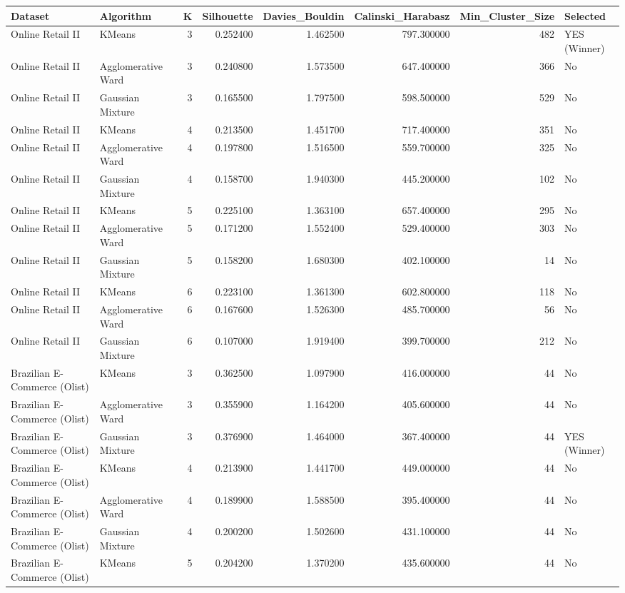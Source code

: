 \begin{tabular}{llrrrrrl}
\toprule
Dataset & Algorithm & K & Silhouette & Davies\_Bouldin & Calinski\_Harabasz & Min\_Cluster\_Size & Selected \\
\midrule
Online Retail II & KMeans & 3 & 0.252400 & 1.462500 & 797.300000 & 482 & YES (Winner) \\
Online Retail II & Agglomerative Ward & 3 & 0.240800 & 1.573500 & 647.400000 & 366 & No \\
Online Retail II & Gaussian Mixture & 3 & 0.165500 & 1.797500 & 598.500000 & 529 & No \\
Online Retail II & KMeans & 4 & 0.213500 & 1.451700 & 717.400000 & 351 & No \\
Online Retail II & Agglomerative Ward & 4 & 0.197800 & 1.516500 & 559.700000 & 325 & No \\
Online Retail II & Gaussian Mixture & 4 & 0.158700 & 1.940300 & 445.200000 & 102 & No \\
Online Retail II & KMeans & 5 & 0.225100 & 1.363100 & 657.400000 & 295 & No \\
Online Retail II & Agglomerative Ward & 5 & 0.171200 & 1.552400 & 529.400000 & 303 & No \\
Online Retail II & Gaussian Mixture & 5 & 0.158200 & 1.680300 & 402.100000 & 14 & No \\
Online Retail II & KMeans & 6 & 0.223100 & 1.361300 & 602.800000 & 118 & No \\
Online Retail II & Agglomerative Ward & 6 & 0.167600 & 1.526300 & 485.700000 & 56 & No \\
Online Retail II & Gaussian Mixture & 6 & 0.107000 & 1.919400 & 399.700000 & 212 & No \\
Brazilian E-Commerce (Olist) & KMeans & 3 & 0.362500 & 1.097900 & 416.000000 & 44 & No \\
Brazilian E-Commerce (Olist) & Agglomerative Ward & 3 & 0.355900 & 1.164200 & 405.600000 & 44 & No \\
Brazilian E-Commerce (Olist) & Gaussian Mixture & 3 & 0.376900 & 1.464000 & 367.400000 & 44 & YES (Winner) \\
Brazilian E-Commerce (Olist) & KMeans & 4 & 0.213900 & 1.441700 & 449.000000 & 44 & No \\
Brazilian E-Commerce (Olist) & Agglomerative Ward & 4 & 0.189900 & 1.588500 & 395.400000 & 44 & No \\
Brazilian E-Commerce (Olist) & Gaussian Mixture & 4 & 0.200200 & 1.502600 & 431.100000 & 44 & No \\
Brazilian E-Commerce (Olist) & KMeans & 5 & 0.204200 & 1.370200 & 435.600000 & 44 & No \\

\end{tabular}
